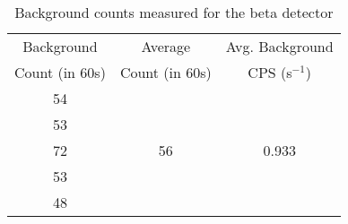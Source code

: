 \begin{table}[]
    \centering
    \begin{tabular}{|c|c|c|}
    \hline
    Background & Average & Avg. Background \\
    Count (in 60s)& Count (in 60s) & CPS (s$^{-1}$) \\ \hline
    54 & \multirow{5}{*}{56} & \multirow{5}{*}{0.933} \\ \cline{1-1}
    53 &  &  \\ \cline{1-1}
    72 &  &  \\ \cline{1-1}
    53 &  &  \\ \cline{1-1}
    48 &  &  \\ \hline
    \end{tabular}
    \caption{Background counts measured for the beta detector}
    \label{tab:1}
\end{table}